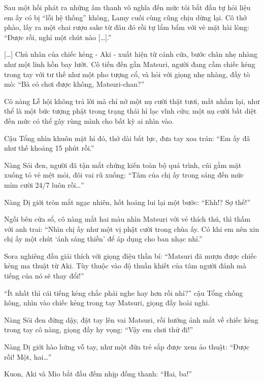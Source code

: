 \documentclass[../main.tex]{subfiles}
\begin{document}
Sau một hồi phát ra những âm thanh vô nghĩa đến mức tôi bắt đầu tự hỏi liệu em ấy có bị ``lỗi hệ thống'' không, Lamy cuối cùng cũng chịu dừng lại. Cô thở phào, lấy ra một chai rượu sake từ đâu đó rồi tự lẩm bẩm với vẻ mặt hài lòng: ``Được rồi, nghỉ một chút nào [\dots].''

{\color{bronze}}   %


[\dots] Chủ nhân của chiếc kẻng - Aki - xuất hiện từ cánh cửa, bước chân nhẹ nhàng như một linh hồn bay lướt. Cô tiến đến gần Matsuri, người đang cầm chiếc kẻng trong tay với tư thế như một pho tượng cổ, và hỏi với giọng nhẹ nhàng, đầy tò mò: ``Bà có chơi được không, Matsuri-chan?''

Cô nàng Lễ hội không trả lời mà chỉ nở một nụ cười thật tươi, mắt nhắm lại, như thể là một bức tượng phật trong trạng thái hỉ lạc vĩnh cửu; một nụ cười bất diệt đến mức có thể gây rùng mình cho bất kỳ ai nhìn vào.

Cậu Tổng nhìn khuôn mặt hỉ đó, thở dài bất lực, đưa tay xoa trán: ``Em ấy đã như thế khoảng 15 phút rồi.''

Nàng Sói đen, người đã tận mắt chứng kiến toàn bộ quá trình, cúi gằm mặt xuống tỏ vẻ mệt mỏi, đôi vai rũ xuống: ``Tâm của chị ấy trong sáng đến mức mỉm cười 24/7 luôn rồi\dots''

Nàng Dị giới tròn mắt ngạc nhiên, hốt hoảng lui lại một bước: ``Ehh!? Sợ thế!''

Ngồi bên cửa sổ, cô nàng mắt hai màu nhìn Matsuri với vẻ thích thú, thì thầm với anh trai: ``Nhìn chị ấy như một vị phật cười trong chùa ấy. Có khi em nên xin chị ấy một chút `ánh sáng thiền' để áp dụng cho ban nhạc nhỉ.''

Sora nghiêng đầu giải thích với giọng điệu thần bí: ``Matsuri đã mượn được chiếc kẻng ma thuật từ Aki. Tùy thuộc vào độ thuần khiết của tâm người đánh mà tiếng của nó sẽ thay đổi!''

``Ít nhất thì cái tiếng kẻng chắc phải nghe hay hơn rồi nhỉ?'' cậu Tổng chống hông, nhìn vào chiếc kẻng trong tay Matsuri, giọng đầy hoài nghi.

Nàng Sói đen đứng dậy, đặt tay lên vai Matsuri, rồi hướng ánh mắt về chiếc kẻng trong tay cô nàng, giọng đầy hy vọng: ``Vậy em chơi thử đi!''

Nàng Dị giới hào hứng vỗ tay, như một đứa trẻ sắp được xem ảo thuật: ``Được rồi! Một, hai\dots''

Kuon, Aki và Mio bắt đầu đếm nhịp đồng thanh: ``Hai, ba!''
\end{document}
